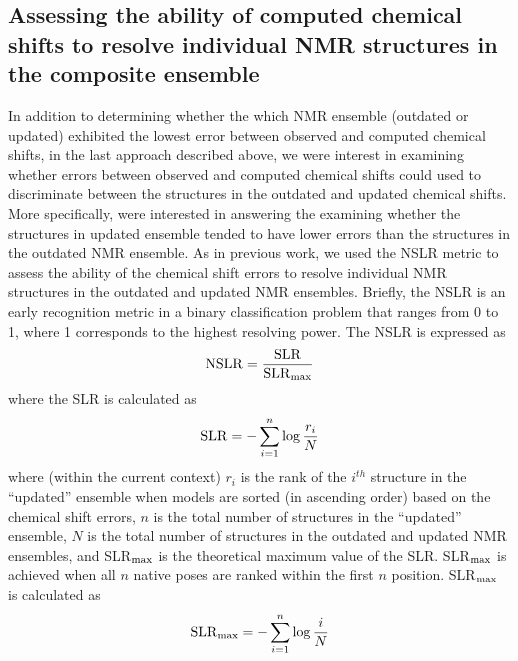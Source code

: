 \documentclass[fleqn,10pt]{wlscirep}
\begin{document}
\subsection*{Assessing the ability of computed chemical shifts to resolve individual NMR structures in the composite ensemble} In addition to determining whether the which NMR ensemble (outdated or updated) exhibited the lowest error between observed and computed chemical shifts, in the last approach described above, we were interest in examining whether errors between observed and computed chemical shifts could used to discriminate between the structures in the outdated and updated chemical shifts. More specifically, were interested in answering the examining whether  the structures in updated ensemble tended to have lower errors than the structures in the outdated NMR ensemble.  As in previous work, we used the NSLR metric\cite{Venkatraman:2010gea} to assess the ability of the chemical shift errors to resolve individual NMR structures in the outdated and updated NMR ensembles. Briefly, the NSLR is an early recognition metric in a binary classification problem \cite{Venkatraman:2010gea} that ranges from 0 to 1, where 1 corresponds to the highest resolving power. The NSLR is expressed as 
\begin{equation}\label{eq:NSLR} 
{\rm{NSLR} }= \frac{\rm{SLR}}{\rm{SLR}_{\rm max}}
\end{equation}
where the SLR is calculated as
\begin{equation}\label{eq:SLR} 
{\rm{SLR}} = - \sum_{i=1}^{n} \log{\frac{r_{i}}{N}}
\end{equation}
where (within the current context) $r_{i}$ is the rank of the $i^{th}$ structure in the ``updated'' ensemble when models are sorted (in ascending order) based on the chemical shift errors, $n$ is the total number of structures in the ``updated'' ensemble, $N$ is the total number of structures in the outdated and updated NMR ensembles, and SLR$_{\rm max}$ is the theoretical maximum value of the SLR. SLR$_{\rm max}$ is achieved when all $n$ native poses are ranked within the first $n$ position. SLR$_{\rm max}$ is calculated as 
\begin{equation}\label{eq:SLRmax} 
{\rm{SLR}_{\rm max}} = - \sum_{i=1}^{n} \log{\frac{i}{N}}
\end{equation}
\end{document}
